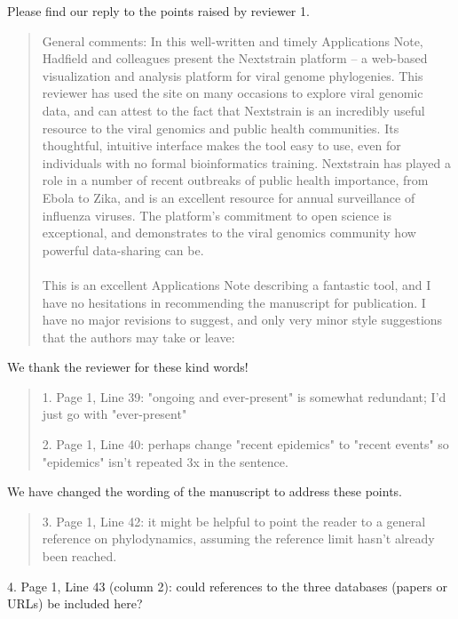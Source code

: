 \documentclass[12pt,a4paper]{article}
\begin{document}
Please find our reply to the points raised by reviewer 1.

\begin{quotation}
General comments:
In this well-written and timely Applications Note, Hadfield and colleagues present the Nextstrain platform – a web-based visualization and analysis platform for viral genome phylogenies. This reviewer has used the site on many occasions to explore viral genomic data, and can attest to the fact that Nextstrain is an incredibly useful resource to the viral genomics and public health communities. Its thoughtful, intuitive interface makes the tool easy to use, even for individuals with no formal bioinformatics training. Nextstrain has played a role in a number of recent outbreaks of public health importance, from Ebola to Zika, and is an excellent resource for annual surveillance of influenza viruses. The platform's commitment to open science is exceptional, and demonstrates to the viral genomics community how powerful data-sharing can be.

\paragraph{}
This is an excellent Applications Note describing a fantastic tool, and I have no hesitations in recommending the manuscript for publication. I have no major revisions to suggest, and only very minor style suggestions that the authors may take or leave:

\end{quotation}

We thank the reviewer for these kind words!


\begin{quote}
1. Page 1, Line 39: "ongoing and ever-present" is somewhat redundant; I'd just go with "ever-present"

2. Page 1, Line 40: perhaps change "recent epidemics" to "recent events" so "epidemics" isn't repeated 3x in the sentence.
\end{quote}

We have changed the wording of the manuscript to address these points. 

\begin{quote}
3. Page 1, Line 42: it might be helpful to point the reader to a general reference on phylodynamics, assuming the reference limit hasn't already been reached.
\end{quote}


4. Page 1, Line 43 (column 2): could references to the three databases (papers or URLs) be included here?
\end{document}
